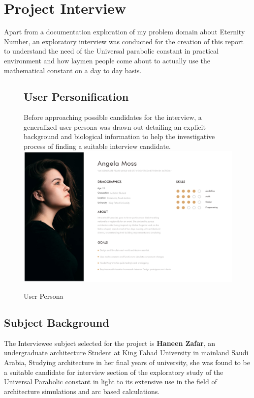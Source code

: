 \documentclass[12pt]{report}
\begin{document}
\chapter{Project Interview}



\begin{flushleft}

Apart from a documentation exploration of my problem domain about Eternity Number, an exploratory interview was conducted for the creation of this report to understand the need of the Universal parabolic constant in practical environment and how laymen people come about to actually use the mathematical constant on a day to day basis.   
\newpage

  \begin{figure}
  \section{User Personification}
\noindent \addlinespace Before approaching possible candidates for the interview, a generalized user persona was drawn out detailing an explicit background and biological information to help the investigative process of finding a suitable interview candidate.\hfill\\

     \includegraphics[width= \textwidth]{Assets/UserPersona.png}
     \caption{User Persona}
     \label{fig:my_label}
 \end{figure}
 \newpage
\section{Subject Background}

 The Interviewee subject selected for the project is \textbf{Haneen Zafar}, an undergraduate architecture Student at King Fahad University in mainland Saudi Arabia, Studying architecture in her final years of university, she was found to be a suitable candidate for interview section of the exploratory study of the Universal Parabolic constant in light to its extensive use in the field of architecture simulations and arc based calculations. \\

\end{flushleft}
\end{document}
